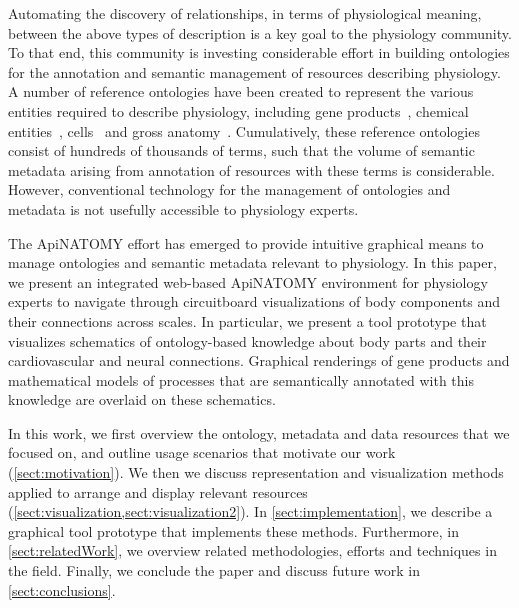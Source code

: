 Automating the discovery of relationships, in terms of physiological meaning, between the above types of description is a key goal to the physiology community. To that end, this community is investing considerable effort in building ontologies for the annotation and semantic management of resources describing physiology. A number of reference ontologies have been created to represent the various entities required to describe physiology, including gene products~\cite{Bla+13}, chemical entities~\cite{HMD+13}, cells~\cite{BRA05} and gross anatomy~\cite{RM03}. Cumulatively, these reference ontologies consist of hundreds of thousands of terms, such that the volume of semantic metadata arising from annotation of resources with these terms is considerable. However, conventional technology for the management of ontologies and metadata is not usefully accessible to physiology experts.

The ApiNATOMY effort has emerged to provide intuitive graphical means to manage ontologies and semantic metadata relevant to physiology. In this paper, we present an integrated web-based ApiNATOMY environment for physiology experts to navigate through circuitboard visualizations of body components and their connections across scales. In particular, we present a tool prototype that visualizes schematics of ontology-based knowledge about body parts and their cardiovascular and neural connections. Graphical renderings of gene products and mathematical models of processes that are semantically annotated with this knowledge are overlaid on these schematics.

In this work, we first overview the ontology, metadata and data resources that we focused on, and outline usage scenarios that motivate our work (\cref{sect:motivation}).  We then we discuss representation and visualization methods applied to arrange and display relevant resources (\cref{sect:visualization,sect:visualization2}). In \cref{sect:implementation}, we describe a graphical tool prototype that implements these methods. Furthermore, in \cref{sect:relatedWork}, we overview related methodologies, efforts and techniques in the field. Finally, we conclude the paper and discuss future work in \cref{sect:conclusions}.
